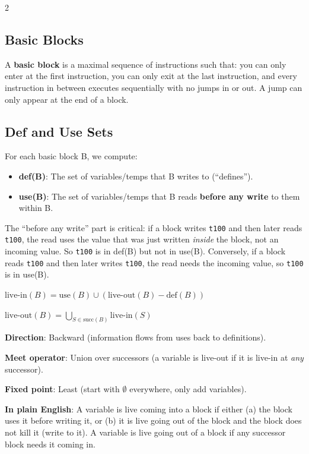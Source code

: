 \documentclass[9pt,landscape]{extarticle}
\begin{document}
\begin{multicols}{2}
\subsection{Basic Blocks}

A \textbf{basic block} is a maximal sequence of instructions such that: you can only enter at the first instruction, you can only exit at the last instruction, and every instruction in between executes sequentially with no jumps in or out. A jump can only appear at the end of a block.

\subsection{Def and Use Sets}

For each basic block B, we compute:
\begin{itemize}
  \item \textbf{def(B)}: The set of variables/temps that B writes to (``defines'').
  \item \textbf{use(B)}: The set of variables/temps that B reads \textbf{before any write} to them within B.
\end{itemize}

The ``before any write'' part is critical: if a block writes \texttt{t100} and then later reads \texttt{t100}, the read uses the value that was just written \emph{inside} the block, not an incoming value. So \texttt{t100} is in def(B) but not in use(B). Conversely, if a block reads \texttt{t100} and then later writes \texttt{t100}, the read needs the incoming value, so \texttt{t100} is in use(B).

\begin{keybox}
$\text{live-in}(B) = \text{use}(B) \cup (\text{live-out}(B) - \text{def}(B))$

$\text{live-out}(B) = \displaystyle\bigcup_{S \in \text{succ}(B)} \text{live-in}(S)$

\textbf{Direction}: Backward (information flows from uses back to definitions).

\textbf{Meet operator}: Union over successors (a variable is live-out if it is live-in at \emph{any} successor).

\textbf{Fixed point}: Least (start with $\emptyset$ everywhere, only add variables).
\end{keybox}

\textbf{In plain English}: A variable is live coming into a block if either (a) the block uses it before writing it, or (b) it is live going out of the block and the block does not kill it (write to it). A variable is live going out of a block if any successor block needs it coming in.


\end{multicols}
\end{document}
